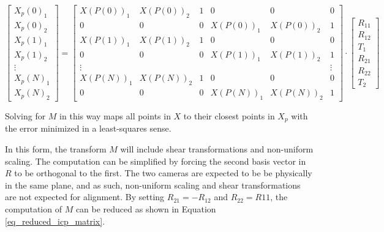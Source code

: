 \documentclass{article}
\begin{document}
\begin{equation}
\begin{bmatrix}
X_p(0)_1 \\
X_p(0)_2 \\
X_p(1)_1 \\
X_p(1)_2 \\
\vdots \\
X_p(N)_1 \\
X_p(N)_2
\end{bmatrix}
=
\begin{bmatrix}
X(P(0))_1 & X(P(0))_2 & 1 & 0 & 0 & 0 \\
0 & 0 & 0 & X(P(0))_1 & X(P(0))_2 & 1 \\
X(P(1))_1 & X(P(1))_2 & 1 & 0 & 0 & 0 \\
0 & 0 & 0 & X(P(1))_1 & X(P(1))_2 & 1 \\
\vdots & & & & & \vdots \\
X(P(N))_1 & X(P(N))_2 & 1 & 0 & 0 & 0 \\
0 & 0 & 0 & X(P(N))_1 & X(P(N))_2 & 1 
\end{bmatrix}
\cdot
\begin{bmatrix}
R_{11} \\
R_{12} \\
T_1 \\
R_{21} \\
R_{22} \\
T_2
\end{bmatrix}
\label{eq_full_icp_matrix}
\end{equation}

Solving for $M$ in this way maps all points in $X$ to their closest points in $X_p$ with the error minimized in a least-squares sense. 

In this form, the transform $M$ will include shear transformations and non-uniform scaling. The computation can be simplified by forcing the second basis vector in $R$ to be orthogonal to the first. The two cameras are expected to be be physically in the same plane, and as such, non-uniform scaling and shear transformations are not expected for alignment. By setting $R_{21} = -R_{12}$ and $R_{22} = R{11}$, the computation of $M$ can be reduced as shown in Equation \ref{eq_reduced_icp_matrix}.
\end{document}
